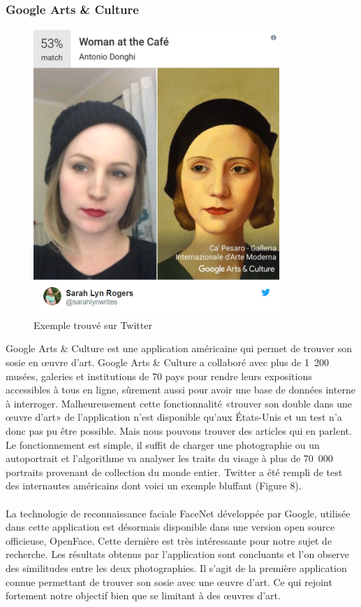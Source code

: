 \documentclass[a4paper,12pt]{article}
\begin{document}
\subsubsection{Google Arts \& Culture}
\begin{figure}[!ht]
    \centering
        \includegraphics[scale=1]{images/GAC.PNG}
        \caption{Exemple trouvé sur Twitter}
    \end{figure}
Google Arts \& Culture est une application américaine qui permet de trouver son sosie en œuvre d’art. Google Arts \& Culture a collaboré avec plus de 1 200 musées, galeries et institutions de 70 pays pour rendre leurs expositions accessibles à tous en ligne, sûrement aussi pour avoir une base de données interne à interroger. Malheureusement cette fonctionnalité «trouver son double dans une œuvre d'art» de l'application n'est disponible qu'aux États-Unis et un test n'a donc pas pu être possible. Mais nous pouvons trouver des articles qui en parlent. Le fonctionnement est simple, il suffit de charger une photographie ou un autoportrait et l'algorithme va analyser les traits du visage à plus de 70 000 portraits provenant de collection du monde entier. Twitter a été rempli de test des internautes américains dont voici un exemple bluffant (Figure 8).\\ \\
La technologie de reconnaissance faciale FaceNet développée par Google, utilisée dans cette application est désormais disponible dans une version open source officieuse, OpenFace. Cette dernière est très intéressante pour notre sujet de recherche. Les résultats obtenus par l'application sont concluants et l'on observe des similitudes entre les deux photographies. Il s'agit de la première application connue permettant de trouver son sosie avec une œuvre d'art. Ce qui rejoint fortement notre objectif bien que se limitant à des œuvres d'art.  
\end{document}

